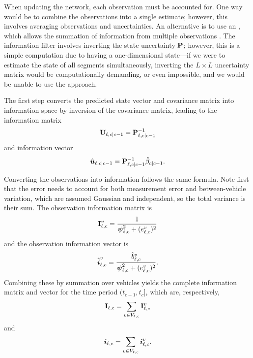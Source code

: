When updating the network, each observation must be accounted for. One way would be to combine the observations into a single estimate; however, this involves averaging observations and uncertainties. An alternative is to use an \emph{\infil{}}, which allows the summation of information from multiple observations \citep{Mutambara_2000}. The information filter involves inverting the state uncertainty $\mathbf{P}$; however, this is a simple computation due to having a one-dimensional state---if we were to estimate the state of all segments simultaneously, inverting the $L\times L$ uncertainty matrix would be computationally demanding, or even impossible, and we would be unable to use the approach.



The first step converts the predicted state vector and covariance matrix into information space by inversion of the covariance matrix, leading to the information matrix
\begin{equation}\label{eq:nw_if_inf_matrix}
\mathbf{U}_{\ell,c|c-1} = \mathbf{P}_{\ell,c|c-1}^{-1}
\end{equation}
and information vector
\begin{equation}\label{eq:nw_if_inf_vector}
\hat{\boldsymbol{u}}_{\ell,c|c-1} = \mathbf{P}_{\ell,c|c-1}^{-1} \hat{\beta}_{c|c-1}.
\end{equation}


Converting the observations into information follows the same formula. Note first that the error needs to account for both measurement error and between-vehicle variation, which are assumed Gaussian and independent, so the total variance is their sum. The observation information matrix is
\begin{equation}\label{eq:nw_if_inf_obsmatrix}
\mathbf{I}_{\ell,c}^v = \frac{1}{\mathbf{\boldsymbol{\psi}}_{\ell,c}^2 + (e_{\ell,c}^v)^2}
\end{equation}
and the observation information vector is
\begin{equation}\label{eq:nw_if_inf_obsvector}
\hat{\boldsymbol{i}}_{\ell,c}^v = \frac{\hat{b}_{\ell,c}^v}{
    \mathbf{\boldsymbol{\psi}}_{\ell,c}^2 + (e_{\ell,c}^v)^2
}.
\end{equation}
Combining these by summation over vehicles yields the complete information matrix and vector for the time period $(t_{c-1},t_c]$, which are, respectively,
\begin{equation}\label{eq:nw_if_obsupdate_matrix}
\mathbf{I}_{\ell,c} = \sum_{v\in V_{\ell,c}} \mathbf{I}_{\ell,c}^v
\end{equation}
and
\begin{equation}\label{eq:nw_if_obsupdate_vector}
\boldsymbol{i}_{\ell,c} = \sum_{v \in V_{\ell,c}} \boldsymbol{i}_{\ell,c}^v.
\end{equation}



